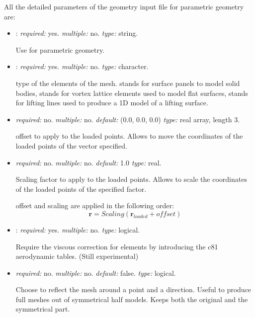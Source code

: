 All the detailed parameters of the geometry input file for parametric geometry are:
\begin{itemize}
\item {}: \textit{required:} yes. \textit{multiple:} no. \textit{type:} string. 

Use  for parametric geometry.

\item {}: \textit{required:} yes. \textit{multiple:} no. \textit{type:} character.

type of the elements of the mesh.  stands for surface panels to model solid bodies,  stands for vortex lattice elements used to model flat surfaces,  stands for lifting lines used to produce a 1D model of a lifting surface. 

\item {} \textit{required:} no. \textit{multiple:} no. \textit{default:} (0.0, 0.0, 0.0) \textit{type:} real array, length 3.

offset to apply to the loaded points. Allows to move the coordinates of the loaded points of the vector specified. 

\item {} \textit{required:} no. \textit{multiple:} no. \textit{default:} 1.0 \textit{type:} real.

Scaling factor to apply to the loaded points. Allows to scale the coordinates of the loaded points of the specified factor.

offset and scaling are applied in the following order:
\begin{equation*}
\mathbf{r} = Scaling (\mathbf{r}_{loaded}+offset)
\end{equation*}


\item {}: \textit{required:} yes. \textit{multiple:} no. \textit{type:} logical.

Require the viscous correction for  elements by introducing the c81 aerodynamic tables. (Still experimental) 


\item {} \textit{required:} no. \textit{multiple:} no. \textit{default:} false. \textit{type:} logical.

Choose to reflect the mesh around a point and a direction. Useful to produce full meshes out of symmetrical half models. Keeps both the original and the symmetrical part. 


\end{itemize}
